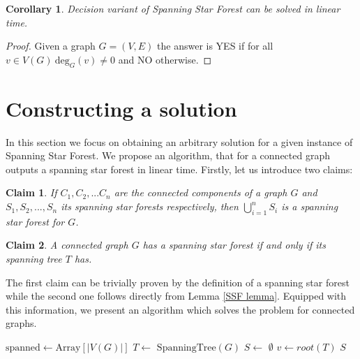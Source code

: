 \documentclass[en]{pracamgr}
\newtheorem{claim}{Claim}
\newtheorem{corollary}{Corollary}
\theoremstyle{definition}
\newcommand{\ssf}{spanning star forest}
\newcommand{\ssfp}{{\sc Spanning Star Forest}}
\newcommand{\degree}[2]{\textrm{deg}_{#1}(#2)}
\begin{document}
\begin{corollary}
	Decision variant of \ssfp{} can be solved in linear time.
\end{corollary}

\begin{proof}
	Given a graph $G = (V,E)$ the answer is YES if for all $v \in V(G)\ \degree{G}{v} \neq 0$ and NO otherwise.
\end{proof}

\section{Constructing a solution}

In this section we focus on obtaining an arbitrary solution for a given instance of \ssfp{}. We propose an algorithm, that for a connected graph outputs a spanning star forest in linear time. Firstly, let us introduce two claims:

\begin{claim} \label{SSF sum}
	If $C_1,C_2,...C_n$ are the connected components of a graph $G$ and $S_1,S_2,...,S_n$ its \ssf{}s respectively, then $\bigcup\limits_{i=1}^n S_i$ is a \ssf{} for $G$.
\end{claim}

\begin{claim} \label{Spanning tree SSF}
	A connected graph $G$ has a \ssf{} if and only if its spanning tree $T$ has.
\end{claim}

The first claim can be trivially proven by the definition of a \ssf{} while the second one follows directly from Lemma \ref{SSF lemma}. Equipped with this information, we present an algorithm which solves the problem for connected graphs.

\begin{algorithm}\label{alg1}
	\KwOut{\ssf{} of $G$}
	$\textrm{spanned} \leftarrow \textrm{Array}[|V(G)|]$\;
	$T \leftarrow$ $\textrm{SpanningTree}(G)$\;
	$S \leftarrow$ $\emptyset$\;
	$v \leftarrow root(T)$\;
	\Return $S$\;
	\caption{Obtaining a spanning star forest from a connected graph.}
\end{algorithm}
\end{document}
